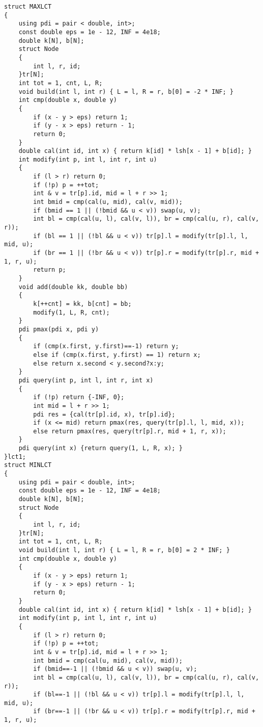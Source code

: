 \documentclass[a4paper,fontset=none]{ctexart}
\begin{document}
\begin{verbatim}
struct MAXLCT
{
    using pdi = pair < double, int>;
    const double eps = 1e - 12, INF = 4e18;
    double k[N], b[N];
    struct Node
    {
        int l, r, id;
    }tr[N];
    int tot = 1, cnt, L, R;
    void build(int l, int r) { L = l, R = r, b[0] = -2 * INF; }
    int cmp(double x, double y)
    {
        if (x - y > eps) return 1;
        if (y - x > eps) return - 1;
        return 0;
    }
    double cal(int id, int x) { return k[id] * lsh[x - 1] + b[id]; }
    int modify(int p, int l, int r, int u)
    {
        if (l > r) return 0;
        if (!p) p = ++tot;
        int & v = tr[p].id, mid = l + r >> 1;
        int bmid = cmp(cal(u, mid), cal(v, mid));
        if (bmid == 1 || (!bmid && u < v)) swap(u, v);
        int bl = cmp(cal(u, l), cal(v, l)), br = cmp(cal(u, r), cal(v, r));
        if (bl == 1 || (!bl && u < v)) tr[p].l = modify(tr[p].l, l, mid, u);
        if (br == 1 || (!br && u < v)) tr[p].r = modify(tr[p].r, mid + 1, r, u);
        return p;
    }
    void add(double kk, double bb)
    {
        k[++cnt] = kk, b[cnt] = bb;
        modify(1, L, R, cnt);
    }
    pdi pmax(pdi x, pdi y)
    {
        if (cmp(x.first, y.first)==-1) return y;
        else if (cmp(x.first, y.first) == 1) return x;
        else return x.second < y.second?x:y;
    }
    pdi query(int p, int l, int r, int x)
    {
        if (!p) return {-INF, 0};
        int mid = l + r >> 1;
        pdi res = {cal(tr[p].id, x), tr[p].id};
        if (x <= mid) return pmax(res, query(tr[p].l, l, mid, x));
        else return pmax(res, query(tr[p].r, mid + 1, r, x));
    }
    pdi query(int x) {return query(1, L, R, x); }
}lct1;
struct MINLCT
{
    using pdi = pair < double, int>;
    const double eps = 1e - 12, INF = 4e18;
    double k[N], b[N];
    struct Node
    {
        int l, r, id;
    }tr[N];
    int tot = 1, cnt, L, R;
    void build(int l, int r) { L = l, R = r, b[0] = 2 * INF; }
    int cmp(double x, double y)
    {
        if (x - y > eps) return 1;
        if (y - x > eps) return - 1;
        return 0;
    }
    double cal(int id, int x) { return k[id] * lsh[x - 1] + b[id]; }
    int modify(int p, int l, int r, int u)
    {
        if (l > r) return 0;
        if (!p) p = ++tot;
        int & v = tr[p].id, mid = l + r >> 1;
        int bmid = cmp(cal(u, mid), cal(v, mid));
        if (bmid==-1 || (!bmid && u < v)) swap(u, v);
        int bl = cmp(cal(u, l), cal(v, l)), br = cmp(cal(u, r), cal(v, r));
        if (bl==-1 || (!bl && u < v)) tr[p].l = modify(tr[p].l, l, mid, u);
        if (br==-1 || (!br && u < v)) tr[p].r = modify(tr[p].r, mid + 1, r, u);

\end{verbatim}
\end{document}
